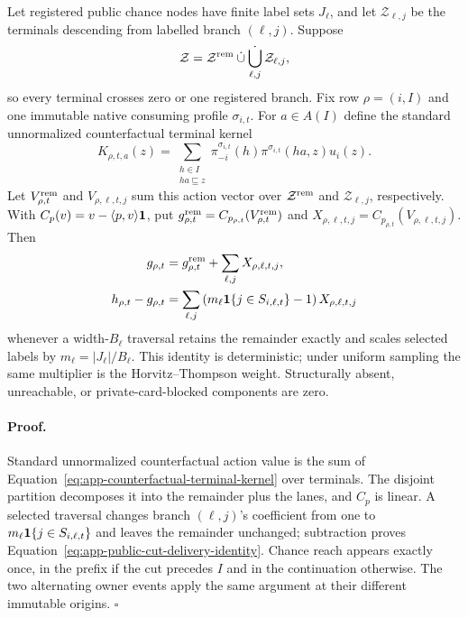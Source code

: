 \begin{lemma}
\label{lem:app-public-cut-lanes}
Let registered public chance nodes have finite label sets $J_\ell$, and let
$\mathcal Z_{\ell,j}$ be the terminals descending from labelled branch
$(\ell,j)$.  Suppose
\begin{equation}
\mathcal Z=\mathcal Z^{\rm rem}\mathbin{\dot\cup}
\mathop{\dot\bigcup}_{\ell,j}\mathcal Z_{\ell,j},
\label{eq:app-public-terminal-partition}
\end{equation}
so every terminal crosses zero or one registered branch.  Fix row
$\rho=(i,I)$ and one immutable native consuming profile $\sigma_{i,t}$.  For
$a\in A(I)$ define the standard unnormalized counterfactual terminal kernel
\begin{equation}
K_{\rho,t,a}(z)=
\sum_{\substack{h\in I\\ha\sqsubseteq z}}
\pi_{-i}^{\sigma_{i,t}}(h)\pi^{\sigma_{i,t}}(ha,z)u_i(z).
\label{eq:app-counterfactual-terminal-kernel}
\end{equation}
Let $V^{\rm rem}_{\rho,t}$ and $V_{\rho,\ell,t,j}$ sum this action vector over
$\mathcal Z^{\rm rem}$ and $\mathcal Z_{\ell,j}$, respectively.  With
$C_p(v)=v-\langle p,v\rangle\mathbf 1$, put
$g^{\rm rem}_{\rho,t}=C_{p_{\rho,t}}(V^{\rm rem}_{\rho,t})$ and
$X_{\rho,\ell,t,j}=C_{p_{\rho,t}}(V_{\rho,\ell,t,j})$.  Then
\begin{align}
g_{\rho,t}&=g^{\rm rem}_{\rho,t}+\sum_{\ell,j}X_{\rho,\ell,t,j},
\nonumber\\
h_{\rho,t}-g_{\rho,t}
&=\sum_{\ell,j}\left(m_\ell\mathbf 1\{j\in S_{i,\ell,t}\}-1\right)
X_{\rho,\ell,t,j}
\label{eq:app-public-cut-delivery-identity}
\end{align}
whenever a width-$B_\ell$ traversal retains the remainder exactly and scales
selected labels by $m_\ell=|J_\ell|/B_\ell$.  This identity is deterministic;
under uniform sampling the same multiplier is the Horvitz--Thompson weight.
Structurally absent, unreachable, or private-card-blocked components are zero.
\end{lemma}

\paragraph{Proof.}
Standard unnormalized counterfactual action value is the sum of
Equation~\ref{eq:app-counterfactual-terminal-kernel} over terminals.  The
disjoint partition decomposes it into the remainder plus the lanes, and $C_p$
is linear.  A selected traversal changes branch $(\ell,j)$'s coefficient from
one
to $m_\ell\mathbf 1\{j\in S_{i,\ell,t}\}$ and leaves the remainder unchanged;
subtraction proves Equation~\ref{eq:app-public-cut-delivery-identity}.  Chance
reach appears exactly once, in the prefix if the cut precedes $I$ and in the
continuation otherwise.  The two alternating owner events apply the same
argument at their different immutable origins. \hfill$\square$

